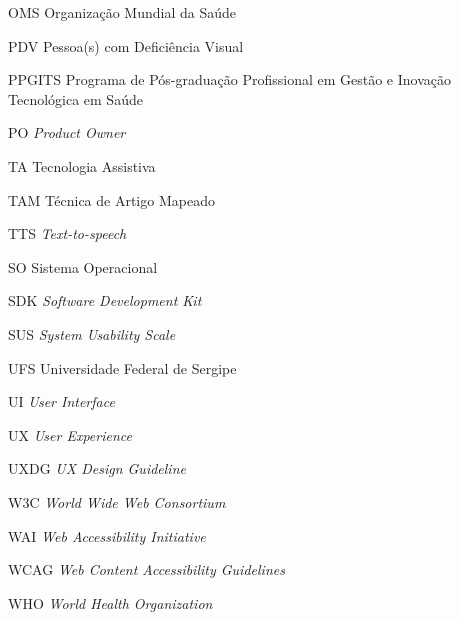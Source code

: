 \begin{siglas}
	\item[OMS]{Organização Mundial da Saúde}
	\item[PDV]{Pessoa(s) com Deficiência Visual}
	\item[PPGITS]{Programa de Pós-graduação Profissional em Gestão e Inovação Tecnológica em Saúde}
	\item[PO]{\emph{Product Owner}}
	\item[TA]{Tecnologia Assistiva}
	\item[TAM]{Técnica de Artigo Mapeado}
	\item[TTS]{\textit{Text-to-speech}}
	\item[SO]{Sistema Operacional}
	\item[SDK]{\textit{Software Development Kit}}
	\item[SUS]{\textit{System Usability Scale}}
	\item[UFS]{Universidade Federal de Sergipe}
	\item[UI]{\textit{User Interface}}
	\item[UX]{\textit{User Experience}}
	\item[UXDG]{\textit{UX Design Guideline}}
	\item[W3C]{\textit{World Wide Web Consortium}}
	\item[WAI]{\textit{Web Accessibility Initiative}}
	\item[WCAG]{\textit{Web Content Accessibility Guidelines}}
	\item[WHO]{\textit{World Health Organization}}
\end{siglas}